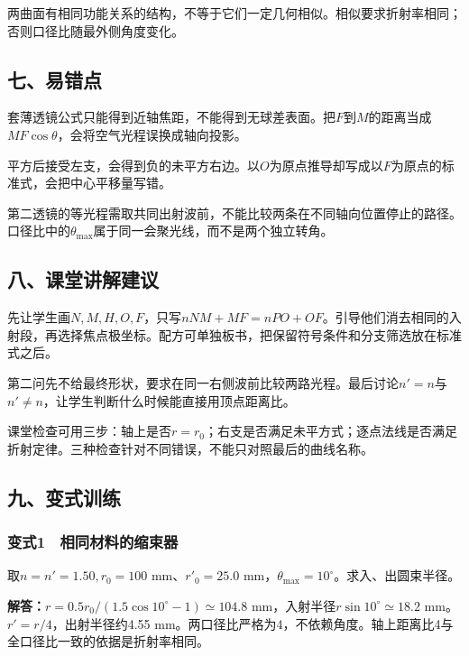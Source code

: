 \documentclass[12pt,a4paper,fontset=fandol]{ctexart}
\begin{document}
两曲面有相同功能关系的结构，不等于它们一定几何相似。相似要求折射率相同；否则口径比随最外侧角度变化。

\subsection{七、易错点}\label{ux4e03ux6613ux9519ux70b9}

套薄透镜公式只能得到近轴焦距，不能得到无球差表面。把\(F\)到\(M\)的距离当成\(MF\cos\theta\)，会将空气光程误换成轴向投影。

平方后接受左支，会得到负的未平方右边。以\(O\)为原点推导却写成以\(F\)为原点的标准式，会把中心平移量写错。

第二透镜的等光程需取共同出射波前，不能比较两条在不同轴向位置停止的路径。口径比中的\(\theta_{\max}\)属于同一会聚光线，而不是两个独立转角。

\subsection{八、课堂讲解建议}\label{ux516bux8bfeux5802ux8bb2ux89e3ux5efaux8bae}

先让学生画\(N,M,H,O,F\)，只写\(nNM+MF=nPO+OF\)。引导他们消去相同的入射段，再选择焦点极坐标。配方可单独板书，把保留符号条件和分支筛选放在标准式之后。

第二问先不给最终形状，要求在同一右侧波前比较两路光程。最后讨论\(n'=n\)与\(n'\neq n\)，让学生判断什么时候能直接用顶点距离比。

课堂检查可用三步：轴上是否\(r=r_0\)；右支是否满足未平方式；逐点法线是否满足折射定律。三种检查针对不同错误，不能只对照最后的曲线名称。

\subsection{九、变式训练}\label{ux4e5dux53d8ux5f0fux8badux7ec3}

\subsubsection{变式1　相同材料的缩束器}\label{ux53d8ux5f0f1-ux76f8ux540cux6750ux6599ux7684ux7f29ux675fux5668}

取\(n=n'=1.50,r_0=100\) mm、\(r'_0=25.0\)
mm，\(\theta_{\max}=10^\circ\)。求入、出圆束半径。

\textbf{解答：}\(r=0.5r_0/(1.5\cos10^\circ-1)\simeq104.8\)
mm，入射半径\(r\sin10^\circ\simeq18.2\) mm。\(r'=r/4\)，出射半径约4.55
mm。两口径比严格为4，不依赖角度。轴上距离比4与全口径比一致的依据是折射率相同。
\end{document}
